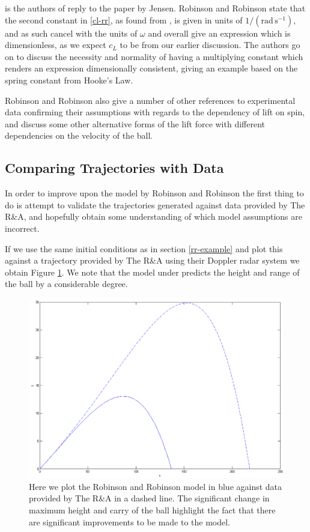 \citet{Robinson2014Reply} is the authors of \citet{Robinson2013} reply to the paper by Jensen. Robinson
and Robinson state that the second constant in \eqref{cl-rr}, as found from \citet{davies1949aerodynamics},
is given in units of $1/(\text{rad} \,\text{s}^{-1})$, and as such cancel with the units of $\omega$ and 
overall give an expression which is dimensionless, as we expect $c_L$ to be from our earlier discussion.
The authors go on to discuss the necessity and normality of having a multiplying constant which renders
an expression dimensionally consistent, giving an example based on the spring constant from Hooke's 
Law.

Robinson and Robinson also give a number of other references to experimental data confirming their
assumptions with regards to the dependency of lift on spin, and discuss some other alternative forms
of the lift force with different dependencies on the velocity of the ball.

\subsection{Comparing Trajectories with Data}

In order to improve upon the model by Robinson and Robinson the first thing to do is attempt to validate
the trajectories generated against data provided by The R\&A, and hopefully obtain some understanding
of which model assumptions are incorrect.

If we use the same initial conditions as in section \ref{rr-example} and plot this against a trajectory
provided by The R\&A using their Doppler radar system we obtain Figure \ref{data-rr-2d}. We note that
the model under predicts the height and range of the ball by a considerable degree.

\begin{figure}
\centering
\includegraphics[scale=0.4]{../images/data1-rr-2d.png}
\caption[Plotting the data against an example Robinson and Robinson trajectory]{Here we plot the Robinson
and Robinson model in blue against data provided by The R\&A in a dashed line. The significant change in maximum height
and carry of the ball highlight the fact that there are significant improvements to be made to the model.}
\label{data-rr-2d}
\end{figure}

